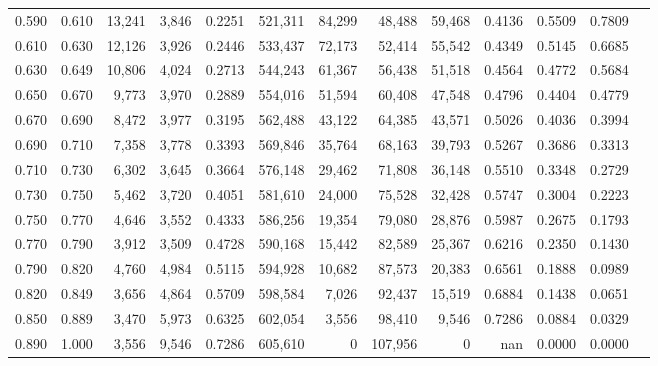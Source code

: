 \begin{tabular}{rrrrrrrrrrrrr}
0.590 & 0.610 &  13,241 & 3,846 &                                     0.2251 & 521,311 &  84,299 &  48,488 &  59,468 & 0.4136 & 0.5509 & 0.7809 \\
0.610 & 0.630 &  12,126 & 3,926 &                                     0.2446 & 533,437 &  72,173 &  52,414 &  55,542 & 0.4349 & 0.5145 & 0.6685 \\
0.630 & 0.649 &  10,806 & 4,024 &                                     0.2713 & 544,243 &  61,367 &  56,438 &  51,518 & 0.4564 & 0.4772 & 0.5684 \\
0.650 & 0.670 &   9,773 & 3,970 &                                     0.2889 & 554,016 &  51,594 &  60,408 &  47,548 & 0.4796 & 0.4404 & 0.4779 \\
0.670 & 0.690 &   8,472 & 3,977 &                                     0.3195 & 562,488 &  43,122 &  64,385 &  43,571 & 0.5026 & 0.4036 & 0.3994 \\
0.690 & 0.710 &   7,358 & 3,778 &                                     0.3393 & 569,846 &  35,764 &  68,163 &  39,793 & 0.5267 & 0.3686 & 0.3313 \\
0.710 & 0.730 &   6,302 & 3,645 &                                     0.3664 & 576,148 &  29,462 &  71,808 &  36,148 & 0.5510 & 0.3348 & 0.2729 \\
0.730 & 0.750 &   5,462 & 3,720 &                                     0.4051 & 581,610 &  24,000 &  75,528 &  32,428 & 0.5747 & 0.3004 & 0.2223 \\
0.750 & 0.770 &   4,646 & 3,552 &                                     0.4333 & 586,256 &  19,354 &  79,080 &  28,876 & 0.5987 & 0.2675 & 0.1793 \\
0.770 & 0.790 &   3,912 & 3,509 &                                     0.4728 & 590,168 &  15,442 &  82,589 &  25,367 & 0.6216 & 0.2350 & 0.1430 \\
0.790 & 0.820 &   4,760 & 4,984 &                                     0.5115 & 594,928 &  10,682 &  87,573 &  20,383 & 0.6561 & 0.1888 & 0.0989 \\
0.820 & 0.849 &   3,656 & 4,864 &                                     0.5709 & 598,584 &   7,026 &  92,437 &  15,519 & 0.6884 & 0.1438 & 0.0651 \\
0.850 & 0.889 &   3,470 & 5,973 &                                     0.6325 & 602,054 &   3,556 &  98,410 &   9,546 & 0.7286 & 0.0884 & 0.0329 \\
0.890 & 1.000 &   3,556 & 9,546 &                                     0.7286 & 605,610 &       0 & 107,956 &       0 &    nan & 0.0000 & 0.0000 \\
\bottomrule
\end{tabular}
